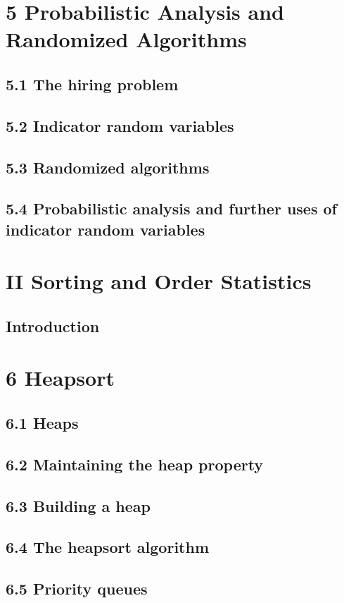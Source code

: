 \documentclass[a4paper]{article}
\begin{document}
\newpage
\section{5 Probabilistic Analysis and Randomized Algorithms}
\subsection{5.1 The hiring problem}
\subsection{5.2 Indicator random variables}
\subsection{5.3 Randomized algorithms}
\subsection{5.4 Probabilistic analysis and further uses of indicator random variables}

\newpage
\section*{II Sorting and Order Statistics}
\subsection*{Introduction}

\newpage
\section{6 Heapsort}
\subsection{6.1 Heaps}
\subsection{6.2 Maintaining the heap property}
\subsection{6.3 Building a heap}
\subsection{6.4 The heapsort algorithm}
\subsection{6.5 Priority queues}
\end{document}
